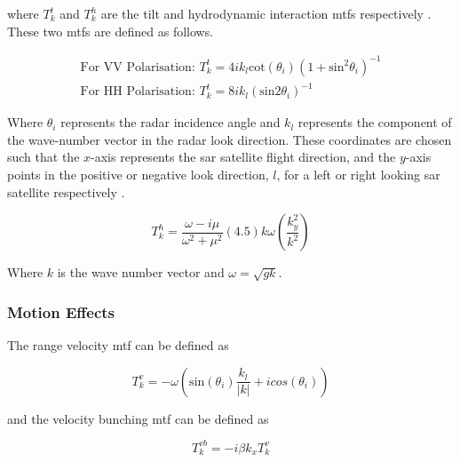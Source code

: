 where $T^t_k$ and $T^h_k$ are the tilt and hydrodynamic interaction \acp{mtf} respectively \cite{Hasselmann1991}. These two \acp{mtf} are defined as follows.

\begin{subequations}  \label{eq:hh.rar.Tt_k}
  \begin{align}
    \text{For VV Polarisation: } T^t_k = 4ik_{l}\text{cot}\left ( \theta_{i}  \right )\left (1+\text{sin}^2\theta_{i}  \right )^{-1} \\
    \text{For HH Polarisation: } T^t_k = 8ik_{l}\left (\text{sin}2\theta_{i}  \right )^{-1}
  \end{align}
\end{subequations} 

Where $\theta_{i}$ represents the radar incidence angle and $k_{l}$ represents the component of the wave-number vector in the radar look direction. These coordinates are chosen such that the $x$-axis represents the \acs{sar} satellite flight direction, and the $y$-axis points in the positive or negative look direction, $l$, for a left or right looking \acs{sar} satellite respectively \cite{Hasselmann1991}. 

\begin{equation} \label{eq:hh.rar.Th_k}
    T^h_k = \frac{\omega - i\mu}{\omega^2 + \mu^2}(4.5)k\omega \left ( \frac{k_y^2}{k^2}  \right )
\end{equation}

Where $k$ is the wave number vector and $\omega = \sqrt{gk}$.

\subsubsection{Motion Effects} \label{subsubsec:theory.hasselmann.sarImaging.motionEffects}

The range velocity \acs{mtf} \cite{Hasselmann1991} can be defined as

\begin{equation} \label{eq:hh.motion.Tv_k}
    T^v_k = -\omega \left ( \text{sin}(\theta_{i})\frac{k_l}{\left | k \right |} +icos(\theta_{i}) \right )
\end{equation}

and the velocity bunching \acs{mtf} \cite{Hasselmann1991} can be defined as

\begin{equation} \label{eq:hh.motion.Tvb_k}
    T^{vb}_k = -i\beta k_{x} T^v_k
\end{equation}

